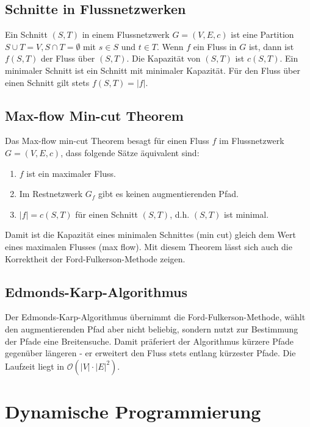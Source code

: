 \documentclass[12pt]{article}
\begin{document}
\subsection{Schnitte in Flussnetzwerken}

Ein Schnitt $(S, T)$ in einem Flussnetzwerk $G= (V, E, c)$ ist eine Partition $S \cup T = V, S \cap T = \emptyset$ mit $s \in S$ und $t \in T$. Wenn $f$ ein Fluss in $G$ ist, dann ist $f(S, T)$ der Fluss über $(S, T)$. Die Kapazität von $(S, T)$ ist $c(S, T)$. Ein minimaler Schnitt ist ein Schnitt mit minimaler Kapazität. Für den Fluss über einen Schnitt gilt stets $f(S, T) = |f|$.

\subsection{Max-flow Min-cut Theorem}

Das Max-flow min-cut Theorem besagt für einen Fluss $f$ im Flussnetzwerk $G=(V,E,c)$, dass folgende Sätze äquivalent sind:

\begin{enumerate}
\item $f$ ist ein maximaler Fluss.
\item Im Restnetzwerk $G_f$ gibt es keinen augmentierenden Pfad.
\item $|f| = c(S, T)$ für einen Schnitt $(S, T)$, d.h. $(S, T)$ ist minimal.
\end{enumerate}

Damit ist die Kapazität eines minimalen Schnittes (min cut) gleich dem Wert eines maximalen Flusses (max flow). Mit diesem Theorem lässt sich auch die Korrektheit der Ford-Fulkerson-Methode zeigen.

\subsection{Edmonds-Karp-Algorithmus}

Der Edmonds-Karp-Algorithmus übernimmt die Ford-Fulkerson-Methode, wählt den augmentierenden Pfad aber nicht beliebig, sondern nutzt zur Bestimmung der Pfade eine Breitensuche. Damit präferiert der Algorithmus kürzere Pfade gegenüber längeren - er erweitert den Fluss stets entlang kürzester Pfade. Die Laufzeit liegt in $\mathcal O(|V|\cdot|E|^2)$.

\section{Dynamische Programmierung}
\end{document}
